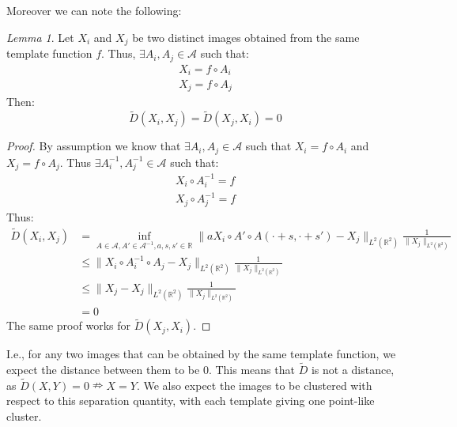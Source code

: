 \documentclass{article}
\theoremstyle{definition}
\theoremstyle{remark}
\theoremstyle{proposition}
\newtheorem{lem}{Lemma}[section]
\begin{document}
            Moreover we can note the following:
            \begin{lem}
                Let $X_i$ and $X_j$ be two distinct images obtained from the same template function $f$. Thus, $\exists A_i,A_j \in \mathcal{A}$ such that:
                \[
                    \begin{array}{c}
                        X_i = f \circ A_i \\
                        X_j = f \circ A_j
                    \end{array}
                \]
                Then:
                \[
                    \tilde{D} (X_i,X_j) = \tilde{D} (X_j,X_i) = 0
                \]
            \end{lem}
            \begin{proof}
                By assumption we know that $\exists A_i,A_j \in \mathcal{A}$ such that $X_i = f \circ A_i$ and $X_j = f \circ A_j$. Thus $\exists A_i^{-1},A_j^{-1} \in \mathcal{A}$ such that:
                \[
                    \begin{array}{c}
                        X_i \circ A_i^{-1} = f \\
                        X_j \circ A_j^{-1} = f
                    \end{array}
                \]
                Thus:
                \begin{align*} 
                    \tilde{D}(X_i,X_j) &= \inf_{A\in\mathcal{A},A' \in \mathcal{A}^{-1},a,s,s'\in \mathbb{R}} \| a X_i \circ A' \circ A(\cdot + s, \cdot + s') - X_j \| _{L^2 (\mathbb{R}^2)} \frac{1}{ \| X_j \| _{L^2 (\mathbb{R}^2)} } \\ 
                    & \leq \| X_i \circ A_i^{-1} \circ A_j - X_j \| _{L^2 (\mathbb{R}^2)} \frac{1}{ \| X_j \| _{L^2 (\mathbb{R}^2)} } \\
                    & \leq \| X_j - X_j \| _{L^2 (\mathbb{R}^2)} \frac{1}{ \| X_j \| _{L^2 (\mathbb{R}^2)} } \\
                    & = 0
                \end{align*}
                The same proof works for $\tilde{D}(X_j,X_i)$.
            \end{proof}

            I.e., for any two images that can be obtained by the same template function, we expect the distance between them to be $0$. This means that $\tilde{D}$ is not a distance, as $\tilde{D}(X,Y) = 0 \nRightarrow X = Y$. We also expect the images to be clustered with respect to this separation quantity, with each template giving one point-like cluster.
    
\end{document}
